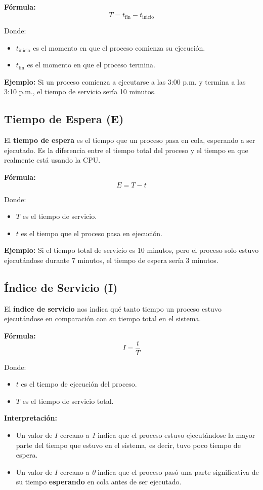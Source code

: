 \textbf{Fórmula:} 
\[
T = t_{\text{fin}} - t_{\text{inicio}}
\]

Donde:
\begin{itemize}
	\item \( t_{\text{inicio}} \) es el momento en que el proceso comienza su ejecución.
	\item \( t_{\text{fin}} \) es el momento en que el proceso termina.
\end{itemize}

\textbf{Ejemplo:} Si un proceso comienza a ejecutarse a las 3:00 p.m. y termina a las 3:10 p.m., el tiempo de servicio sería 10 minutos.

\subsection{Tiempo de Espera (E)}
El \textbf{tiempo de espera} es el tiempo que un proceso pasa en cola, esperando a ser ejecutado. Es la diferencia entre el tiempo total del proceso y el tiempo en que realmente está usando la CPU.

\textbf{Fórmula:}
\[
E = T - t
\]

Donde:
\begin{itemize}
	\item \( T \) es el tiempo de servicio.
	\item \( t \) es el tiempo que el proceso pasa en ejecución.
\end{itemize}

\textbf{Ejemplo:} Si el tiempo total de servicio es 10 minutos, pero el proceso solo estuvo ejecutándose durante 7 minutos, el tiempo de espera sería 3 minutos.

\newpage

\subsection{Índice de Servicio (I)}
El \textbf{índice de servicio} nos indica qué tanto tiempo un proceso estuvo ejecutándose en comparación con su tiempo total en el sistema.

\textbf{Fórmula:}
\[
I = \frac{t}{T}
\]

Donde:
\begin{itemize}
	\item \( t \) es el tiempo de ejecución del proceso.
	\item \( T \) es el tiempo de servicio total.
\end{itemize}


\textbf{Interpretación:}
\begin{itemize}
	\item Un valor de \( I \) cercano a \textit{1} indica que el proceso estuvo ejecutándose la mayor parte del tiempo que estuvo en el sistema, es decir, tuvo poco tiempo de espera.
	\item Un valor de \( I \) cercano a \textit{0} indica que el proceso pasó una parte significativa de su tiempo \textbf{esperando} en cola antes de ser ejecutado.
\end{itemize}

